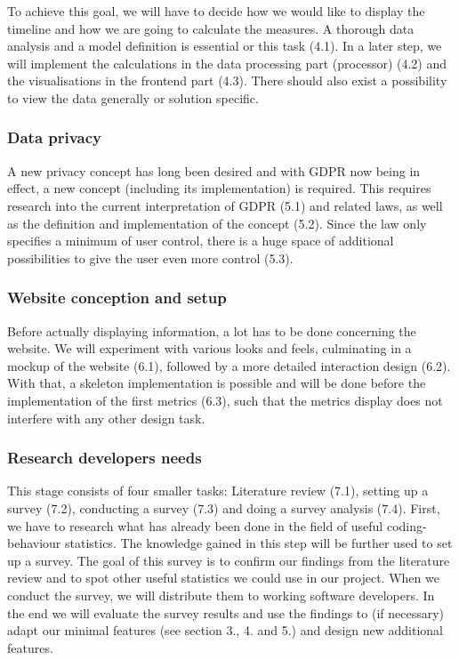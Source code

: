 \documentclass{seal_article}
\begin{document}
To achieve this goal, we will have to decide how we would like to display the timeline and how we are going to calculate the measures. A thorough data analysis and a model definition is essential or this task (4.1). In a later step, we will implement the calculations in the data processing part (processor) (4.2) and the visualisations in the frontend part (4.3). There should also exist a possibility to ​view the data generally or solution specific.

\subsubsection{Data privacy}
A new privacy concept has long been desired and with GDPR now being in effect, a new concept (including its implementation) is required. This requires research into the current interpretation of GDPR (5.1) and related laws, as well as the definition and implementation of the concept (5.2). Since the law only specifies a minimum of user control, there is a huge space of additional possibilities to give the user even more control (5.3).

\subsubsection{Website conception and setup}
Before actually displaying information, a lot has to be done concerning the website. We will experiment with various looks and feels, culminating in a mockup of the website (6.1), followed by a more detailed interaction design (6.2). With that, a skeleton implementation is possible and will be done before the implementation of the first metrics (6.3), such that the metrics display does not interfere with any other design task.

\subsubsection{Research developers needs}
This stage consists of four smaller tasks: Literature review (7.1), setting up a survey (7.2), conducting a survey (7.3) and doing a survey analysis (7.4). First, we have to research what has already been done in the field of useful coding-behaviour statistics. The knowledge gained in this step will be further used to set up a survey. The goal of this survey is to confirm our findings from the literature review and to spot other useful statistics we could use in our project. When we conduct the survey, we will distribute them to working software developers. In the end we will evaluate the survey results and use the findings to (if necessary) adapt our minimal features (see section 3., 4. and 5.) and design new additional features.
\end{document}
